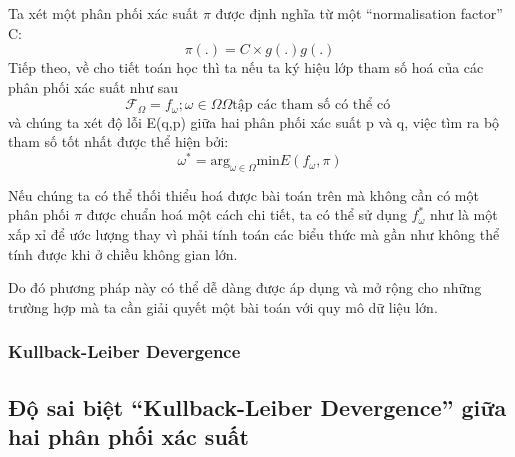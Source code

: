         Ta xét một phân phối xác suất $\pi$ được định nghĩa từ một ``normalisation factor'' C:        
        $$\pi(.) = C \times g(.) g(.)$$
        Tiếp theo, về cho tiết toán học thì ta nếu ta ký hiệu lớp tham số hoá của các phân phối xác suất như sau
        $$\mathcal{F}_\Omega = {f_\omega; \omega \in \Omega} \Omega  \text{tập các tham số có thể có  }$$
        và chúng ta xét độ lỗi E(q,p) giữa hai phân phối xác suất p và q, việc tìm ra bộ tham số tốt nhất được thể hiện bởi:
        $$\omega^* = \text{arg}_{\omega\in\Omega} \text{min}E(f_\omega,\pi) $$

        Nếu chúng ta có thể thối thiểu hoá được bài toán trên mà không cần có một phân phối $\pi$ được chuẩn hoá một cách chi tiết, ta có thể  sử dụng $f_\omega^*$ như là một xấp xỉ để ước lượng thay vì phải tính toán các biểu thức mà gần như không thể tính được khi ở chiều không gian lớn. 
        
        Do đó phương pháp này có thể dễ dàng được áp dụng và mở rộng cho những trường hợp mà ta cần giải quyết một bài toán với quy mô dữ liệu lớn. 
        

        \subsubsection{Kullback-Leiber Devergence}

    \subsection{Độ sai biệt ``Kullback-Leiber Devergence'' giữa hai phân phối xác suất}  \label{chap2/subsec23}